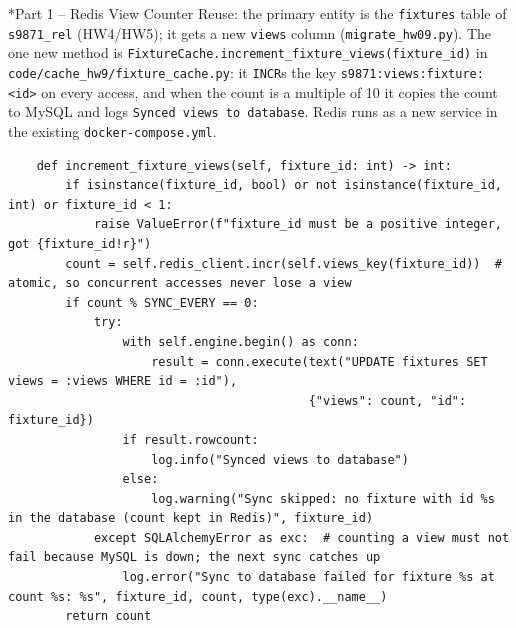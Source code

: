 \documentclass[11pt]{article}
\makeatletter
\renewcommand\section{\@startsection{section}{1}{\z@}{-3.0ex \@plus -1ex \@minus -.2ex}{1.2ex \@plus.2ex}{\normalfont\fontsize{14}{17}\selectfont\bfseries}}
\makeatother
\begin{document}
\section*{Part 1 -- Redis View Counter}
Reuse: the primary entity is the \texttt{fixtures} table of \texttt{s9871\_\allowbreak{}rel} (HW4/HW5); it gets a new \texttt{views} column (\texttt{migrate\_\allowbreak{}hw09.py}). The one new method is \texttt{FixtureCache.increment\_\allowbreak{}fixture\_\allowbreak{}views(fixture\_\allowbreak{}id)} in \texttt{code/\allowbreak{}cache\_\allowbreak{}hw9/\allowbreak{}fixture\_\allowbreak{}cache.py}: it \texttt{INCR}s the key \texttt{s9871:\allowbreak{}views:\allowbreak{}fixture:\allowbreak{}<id>} on every access, and when the count is a multiple of 10 it copies the count to MySQL and logs \texttt{Synced views to database}. Redis runs as a new service in the existing \texttt{docker-compose.yml}.

\begingroup\lstset{basicstyle=\ttfamily\scriptsize}
\begin{lstlisting}
    def increment_fixture_views(self, fixture_id: int) -> int:
        if isinstance(fixture_id, bool) or not isinstance(fixture_id, int) or fixture_id < 1:
            raise ValueError(f"fixture_id must be a positive integer, got {fixture_id!r}")
        count = self.redis_client.incr(self.views_key(fixture_id))  # atomic, so concurrent accesses never lose a view
        if count % SYNC_EVERY == 0:
            try:
                with self.engine.begin() as conn:
                    result = conn.execute(text("UPDATE fixtures SET views = :views WHERE id = :id"),
                                          {"views": count, "id": fixture_id})
                if result.rowcount:
                    log.info("Synced views to database")
                else:
                    log.warning("Sync skipped: no fixture with id %s in the database (count kept in Redis)", fixture_id)
            except SQLAlchemyError as exc:  # counting a view must not fail because MySQL is down; the next sync catches up
                log.error("Sync to database failed for fixture %s at count %s: %s", fixture_id, count, type(exc).__name__)
        return count
\end{lstlisting}
\endgroup
\end{document}
